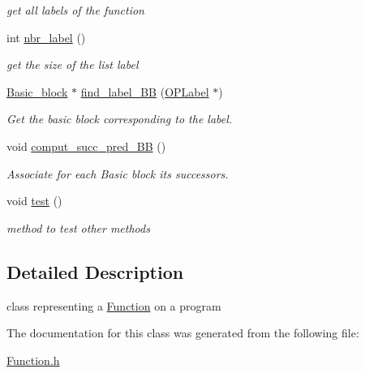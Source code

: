 \begin{DoxyCompactItemize}
\begin{DoxyCompactList}\small\item\em get all labels of the function \item\end{DoxyCompactList}\item 
\hypertarget{classFunction_a3f3807e12e695ffe23e1ef44edcd262b}{
int \hyperlink{classFunction_a3f3807e12e695ffe23e1ef44edcd262b}{nbr\_\-label} ()}
\label{classFunction_a3f3807e12e695ffe23e1ef44edcd262b}

\begin{DoxyCompactList}\small\item\em get the size of the list label \item\end{DoxyCompactList}\item 
\hypertarget{classFunction_ae55c0232d0eced8830daf57293229db8}{
\hyperlink{classBasic__block}{Basic\_\-block} $\ast$ \hyperlink{classFunction_ae55c0232d0eced8830daf57293229db8}{find\_\-label\_\-BB} (\hyperlink{classOPLabel}{OPLabel} $\ast$)}
\label{classFunction_ae55c0232d0eced8830daf57293229db8}

\begin{DoxyCompactList}\small\item\em Get the basic block corresponding to the label. \item\end{DoxyCompactList}\item 
\hypertarget{classFunction_a3c52c8cb82e0137f02771331018b655c}{
void \hyperlink{classFunction_a3c52c8cb82e0137f02771331018b655c}{comput\_\-succ\_\-pred\_\-BB} ()}
\label{classFunction_a3c52c8cb82e0137f02771331018b655c}

\begin{DoxyCompactList}\small\item\em Associate for each Basic block its successors. \item\end{DoxyCompactList}\item 
\hypertarget{classFunction_aaa0d06640a5075c416106a88bd9a833a}{
void \hyperlink{classFunction_aaa0d06640a5075c416106a88bd9a833a}{test} ()}
\label{classFunction_aaa0d06640a5075c416106a88bd9a833a}

\begin{DoxyCompactList}\small\item\em method to test other methods \item\end{DoxyCompactList}\end{DoxyCompactItemize}


\subsection{Detailed Description}
class representing a \hyperlink{classFunction}{Function} on a program 

The documentation for this class was generated from the following file:\begin{DoxyCompactItemize}
\item 
\hyperlink{Function_8h}{Function.h}\end{DoxyCompactItemize}
